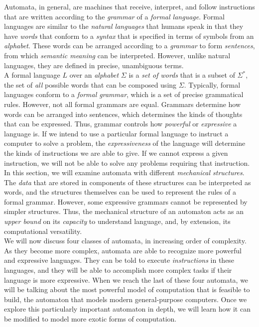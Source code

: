 Automata, in general, are machines that receive, interpret, and follow instructions that are written according to the \textit{grammar} of a \textit{formal language}. Formal languages are similar to the \textit{natural languages} that humans speak in that they have \textit{words} that conform to a \textit{syntax} that is specified in terms of symbols from an \textit{alphabet}. These words can be arranged according to a \textit{grammar} to form \textit{sentences}, from which \textit{semantic meaning} can be interpreted. However, unlike natural languages, they are defined in precise, unambiguous terms. \\

A formal language $L$ over an \textit{alphabet} $\Sigma$ is a \textit{set of words} that is a subset of $\Sigma^*$, the set of \textit{all} possible words that can be composed using $\Sigma$. Typically, formal languages conform to a \textit{formal grammar}, which is a set of precise grammatical rules. However, not all formal grammars are equal. Grammars determine how words can be arranged into sentences, which determines the kinds of thoughts that can be expressed. Thus, grammar controls how \textit{powerful} or \textit{expressive} a language is. If we intend to use a particular formal language to instruct a computer to solve a problem, the \textit{expressiveness} of the language will determine the kinds of instructions we are able to give. If we cannot express a given instruction, we will not be able to solve any problems requiring that instruction. \\

In this section, we will examine automata with different \textit{mechanical structures}. The \textit{data} that are stored in components of these structures can be interpreted as words, and the structures themselves can be used to represent the rules of a formal grammar. However, some expressive grammars cannot be represented by simpler structures. Thus, the mechanical structure of an automaton acts as an \textit{upper bound} on its \textit{capacity} to understand language, and, by extension, its computational versatility. \\

We will now discuss four classes of automata, in increasing order of complexity. As they become more complex, automata are able to recognize more powerful and expressive languages. They can be told to execute \textit{instructions} in these languages, and they will be able to accomplish more complex tasks if their language is more expressive. When we reach the last of these four automata, we will be talking about the most powerful model of computation that is feasible to build, the automaton that models modern general-purpose computers. Once we explore this particularly important automaton in depth, we will learn how it can be modified to model more exotic forms of computation. \\

